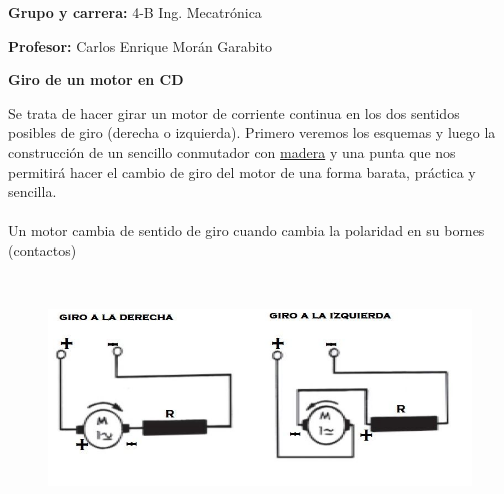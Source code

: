 \documentclass[12pt]{article}
\begin{document}
\begin{Center}
\textbf{Grupo y carrera: }4-B Ing. Mecatrónica
\end{Center}\par

\begin{Center}
\textbf{Profesor: }Carlos Enrique Morán Garabito
\end{Center}\par


\vspace{\baselineskip}

\vspace{\baselineskip}

\vspace{\baselineskip}
\newpage
\begin{justify}
{\fontsize{14pt}{16.8pt}\selectfont \textbf{Giro de un motor en CD}\par}
\end{justify}\par

\begin{justify}
Se trata de hacer girar un motor de corriente continua en los dos sentidos posibles de giro (derecha o izquierda). Primero veremos los esquemas y luego la construcción de un sencillo conmutador con \href{https://www.areatecnologia.com/materiales/madera.html}{madera} y una punta que nos permitirá hacer el cambio de giro del motor de una forma barata, práctica y sencilla.\\
\\
Un motor cambia de sentido de giro cuando cambia la polaridad en su bornes (contactos)
\end{justify}\par




\begin{figure}[H]
	\begin{Center}
		\includegraphics[width=6.14in,height=2.56in]{./media/image2.png}
	\end{Center}
\end{figure}
\end{document}
